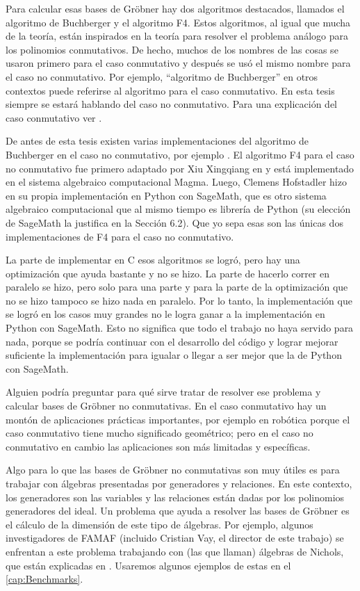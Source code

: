 \documentclass[12pt]{report}
\theoremstyle{customstyle}
\theoremstyle{factstyle}
\newcommand\cpp{C\nolinebreak[4]\hspace{-.05em}\raisebox{.4ex}{\relsize{-3}{\textbf{++}}}\xspace}
\begin{document}
Para calcular esas bases de Gröbner hay dos algoritmos destacados, llamados el algoritmo de Buchberger y el algoritmo F4. Estos algoritmos, al igual que mucha de la teoría, están inspirados en la teoría para resolver el problema análogo para los polinomios conmutativos. De hecho, muchos de los nombres de las cosas se usaron primero para el caso conmutativo y después se usó el mismo nombre para el caso no conmutativo. Por ejemplo, ``algoritmo de Buchberger'' en otros contextos puede referirse al algoritmo para el caso conmutativo. En esta tesis siempre se estará hablando del caso no conmutativo. Para una explicación del caso conmutativo ver \cite{book:ideals-varieties-algorithms}.

De antes de esta tesis existen varias implementaciones del algoritmo de Buchberger en el caso no conmutativo, por ejemplo \cite{lib:GBNP, lib:DGPS, lib:NCAlgebra}. El algoritmo F4 para el caso no conmutativo fue primero adaptado por Xiu Xingqiang en \cite{phdthesis:XiuXingqiang12} y está implementado en el sistema algebraico computacional Magma. Luego, Clemens Hofstadler hizo en \cite{thesis:Hof20} su propia implementación en Python con SageMath, que es otro sistema algebraico computacional que al mismo tiempo es librería de Python (su elección de SageMath la justifica en la Sección 6.2). Que yo sepa esas son las únicas dos implementaciones de F4 para el caso no conmutativo.

La parte de implementar en \cpp esos algoritmos se logró, pero hay una optimización que ayuda bastante y no se hizo. La parte de hacerlo correr en paralelo se hizo, pero solo para una parte y para la parte de la optimización que no se hizo tampoco se hizo nada en paralelo. Por lo tanto, la implementación que se logró en los casos muy grandes no le logra ganar a la implementación en Python con SageMath. Esto no significa que todo el trabajo no haya servido para nada, porque se podría continuar con el desarrollo del código y lograr mejorar suficiente la implementación para igualar o llegar a ser mejor que la de Python con SageMath.

Alguien podría preguntar para qué sirve tratar de resolver ese problema y calcular bases de Gröbner no conmutativas. En el caso conmutativo hay un montón de aplicaciones prácticas importantes, por ejemplo en robótica porque el caso conmutativo tiene mucho significado geométrico; pero en el caso no conmutativo en cambio las aplicaciones son más limitadas y específicas.

Algo para lo que las bases de Gröbner no conmutativas son muy útiles es para trabajar con álgebras presentadas por generadores y relaciones. En este contexto, los generadores son las variables y las relaciones están dadas por los polinomios generadores del ideal. Un problema que ayuda a resolver las bases de Gröbner es el cálculo de la dimensión de este tipo de álgebras. Por ejemplo, algunos investigadores de FAMAF (incluido Cristian Vay, el director de este trabajo) se enfrentan a este problema trabajando con (las que llaman) álgebras de Nichols, que están explicadas en \cite{book:introNichols}. Usaremos algunos ejemplos de estas en el \cref{cap:Benchmarks}.
\end{document}
